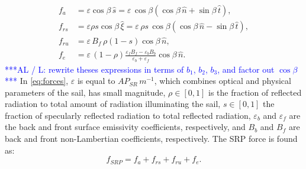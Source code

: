 \documentclass[AMA,STIX1COL]{WileyNJD-v2}
\newcommand{\uvect}[1]{\hat{#1}}
\newcommand{\vect}[1]{#1}
\renewcommand{\epsilon}{\varepsilon}
\newcommand{\bluetext}{\textcolor{blue}}
\newcommand{\com}[1]{\bluetext{***#1***}}
\begin{document}
\begin{equation} \label{eq:forces}
	\begin{aligned}
		\vect{f}_a    &= \epsilon \cos \beta \, \uvect{s} = \epsilon \, \cos \beta(\cos \beta \, \uvect{n} + \sin \beta \, \uvect{t}),\\
		\vect{f}_{rs} &= \epsilon \rho s \cos \beta \, \uvect{\xi}= \epsilon \, \rho s\, \cos \beta ( \cos \beta\, \uvect{n} - \sin \beta\, \uvect{t}),\\
		\vect{f}_{ru} &= \epsilon \, B_f\, \rho (1-s) \cos \beta\, \uvect{n},\\
		\vect{f}_{e}  &= \epsilon \, (1 - \rho) \frac{\epsilon_f B_f - \epsilon_b B_b}{\epsilon_b + \epsilon_f} \cos \beta \,\uvect{n}.
	\end{aligned}
\end{equation}
%
\com{AL / L: rewrite theses expressions in terms of $b_1$, $b_2$, $b_3$, and factor out $\cos\beta$}
%
In \eqref{eq:forces}, $\epsilon$ is equal to $A P_{SR}\, m^{-1}$,
which combines optical and physical parameters of the sail, has small magnitude, $\rho \in [0, 1]$ is the fraction of reflected radiation to total amount of radiation illuminating the sail, $s \in [0, 1]$ the fraction of specularly reflected radiation to total reflected radiation, $\epsilon_b$ and $\epsilon_f$ are the back and front surface emissivity coefficients, respectively, and $B_b$ and $B_f$ are back and front non-Lambertian coefficients, respectively. The \ac{SRP} force is found as:
\begin{equation} \label{eq:resultant}
	\vect{f}_{SRP} =  \vect{f}_a + \vect{f}_{rs} + \vect{f}_{ru} + \vect{f}_e.
\end{equation}
\end{document}
